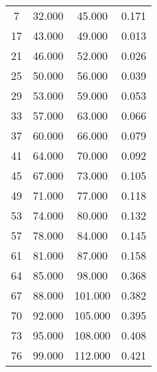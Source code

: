 % 
\begin{tabular}{cccc}
  \hline
  \hline
7 & 32.000 & 45.000 & 0.171 \\ 
  17 & 43.000 & 49.000 & 0.013 \\ 
  21 & 46.000 & 52.000 & 0.026 \\ 
  25 & 50.000 & 56.000 & 0.039 \\ 
  29 & 53.000 & 59.000 & 0.053 \\ 
  33 & 57.000 & 63.000 & 0.066 \\ 
  37 & 60.000 & 66.000 & 0.079 \\ 
  41 & 64.000 & 70.000 & 0.092 \\ 
  45 & 67.000 & 73.000 & 0.105 \\ 
  49 & 71.000 & 77.000 & 0.118 \\ 
  53 & 74.000 & 80.000 & 0.132 \\ 
  57 & 78.000 & 84.000 & 0.145 \\ 
  61 & 81.000 & 87.000 & 0.158 \\ 
  64 & 85.000 & 98.000 & 0.368 \\ 
  67 & 88.000 & 101.000 & 0.382 \\ 
  70 & 92.000 & 105.000 & 0.395 \\ 
  73 & 95.000 & 108.000 & 0.408 \\ 
  76 & 99.000 & 112.000 & 0.421 \\ 
   \hline
\end{tabular}
